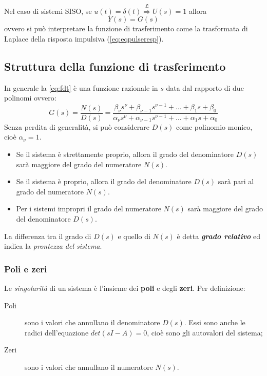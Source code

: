 \documentclass[a4paper]{report}
\begin{document}
Nel caso di sistemi SISO, se
$u(t)=\delta(t) \stackrel{\mathfrak{L}}{\Rightarrow} U(s)=1$ allora
\[
Y(s)=G(s)
\]
ovvero si pu\`o interpretare la funzione di trasferimento come la
trasformata di Laplace della risposta impulsiva (\ref{eq:eqpulseresp}). 

\subsection{Struttura della funzione di trasferimento}
In generale la \ref{eq:fdt} \`e una funzione razionale in $s$ data dal
rapporto di due polinomi ovvero: 
\begin{equation}\label{eq:genfdt}
  G(s)=\frac{N(s)}{D(s)}=\frac{\beta_\nu s^\nu+\beta_{\nu-1}s^{\nu-1}+
    \ldots+\beta_1s+\beta_0}{\alpha_\nu s^\nu+\alpha_{\nu-1}s^{\nu-1}+
    \ldots+\alpha_1s+\alpha_0}
\end{equation} 
Senza perdita di generalit\`a, si pu\`o considerare $D(s)$ come
polinomio monico, cio\`e $\alpha_\nu=1$.

\begin{itemize}
\item Se il sistema \`e strettamente proprio, allora il grado del
  denominatore $D(s)$ sar\`a maggiore  del grado del numeratore $N(s)$.
\item Se il sistema \`e proprio, allora il
  grado del denominatore $D(s)$ sar\`a pari al grado del numeratore
  $N(s)$. 
\item Per i sistemi impropri il grado del
  numeratore $N(s)$ sar\`a maggiore del grado del denominatore $D(s)$.
\end{itemize}
La differenza tra il grado di $D(s)$ e quello di $N(s)$ \`e detta
\emph{\textbf{grado relativo}} ed indica la
\emph{prontezza del sistema}.

\subsubsection{Poli e zeri}
Le \emph{singolarit\`a} di un sistema \`e l'insieme dei \textbf{poli} e
degli \textbf{zeri}. Per definizione:
\begin{description}
\item[Poli] sono i valori che annullano il denominatore $D(s)$. Essi
  sono anche le radici dell'equazione $det(sI - A) = 0$, cio\`e sono gli
  autovalori del sistema;
\item[Zeri] sono i valori che annullano il numeratore $N(s)$.
\end{description}
\end{document}
